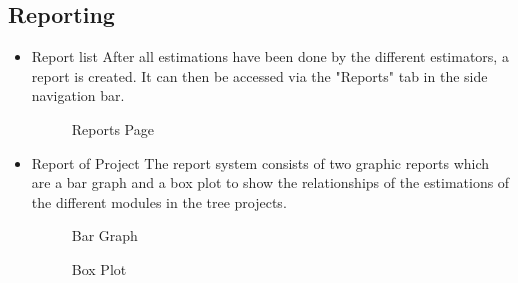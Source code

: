 \subsection{Reporting}
\begin{itemize}
   	\item{Report list}
	\newline
	After all estimations have been done by the different estimators, a report is created. It can then be accessed via the "Reports" tab in the side navigation bar.
	\begin{figure}[H]
	    	\centering
	    	\caption{Reports Page}
	    	\label{fig:Learning rate 0.1}
   	\end{figure}
   	\pagebreak
   	\item{Report of Project}
	\newline
	The report system consists of two graphic reports which are a bar graph and a box plot to show the relationships of the estimations of the different modules in the tree projects.
	\begin{figure}[H]
	    	\centering
	    	\caption{Bar Graph}
	    	\label{fig:Learning rate 0.1}
   	\end{figure}
   	\begin{figure}[H]
   			\centering
	    	\caption{Box Plot}
	    	\label{fig:Learning rate 0.1}
   	\end{figure}
\end{itemize}
\pagebreak